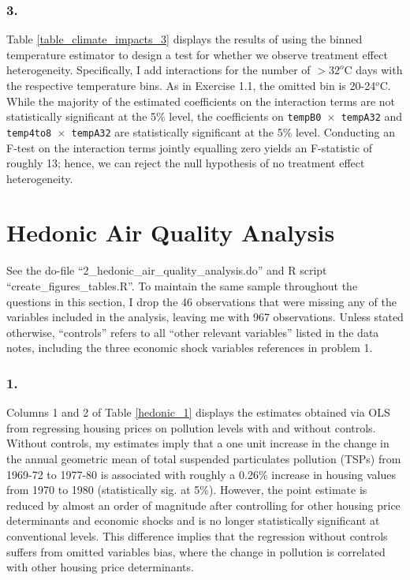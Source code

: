 \documentclass[12pt]{article}
\begin{document}
\subsubsection*{3.}
Table \ref{table_climate_impacts_3} displays the results of using the binned temperature estimator to design a test for whether we observe treatment effect heterogeneity. Specifically, I add interactions for the number of $>32^o$C days with the respective temperature bins. As in Exercise 1.1, the omitted bin is 20-24$^o$C. While the majority of the estimated coefficients on the interaction terms are not statistically significant at the 5\% level, the coefficients on \texttt{tempB0 $\times$ tempA32} and \texttt{temp4to8 $\times$ tempA32} are statistically significant at the 5\% level. Conducting an F-test on the interaction terms jointly equalling zero yields an F-statistic of roughly 13; hence, we can reject the null hypothesis of no treatment effect heterogeneity.

\clearpage

\section{Hedonic Air Quality Analysis}
See the do-file ``2_hedonic_air_quality_analysis.do'' and R script ``create_figures_tables.R''. To maintain the same sample throughout the questions in this section, I drop the 46 observations that were missing any of the variables included in the analysis, leaving me with 967 observations. Unless stated otherwise, ``controls'' refers to all ``other relevant variables'' listed in the data notes, including the three economic shock variables references in problem 1.

\subsubsection*{1.}

Columns 1 and 2 of Table \ref{hedonic_1} displays the estimates obtained via OLS from regressing housing prices on pollution levels with and without controls. Without controls, my estimates imply that a one unit increase in the change in the annual geometric mean of total suspended particulates pollution (TSPs) from 1969-72 to 1977-80 is associated with roughly a 0.26\% increase in housing values from 1970 to 1980 (statistically sig. at 5\%). However, the point estimate is reduced by almost an order of magnitude after controlling for other housing price determinants and economic shocks and is no longer statistically significant at conventional levels. This difference implies that the regression without controls suffers from omitted variables bias, where the change in pollution is correlated with other housing price determinants. 
\end{document}
